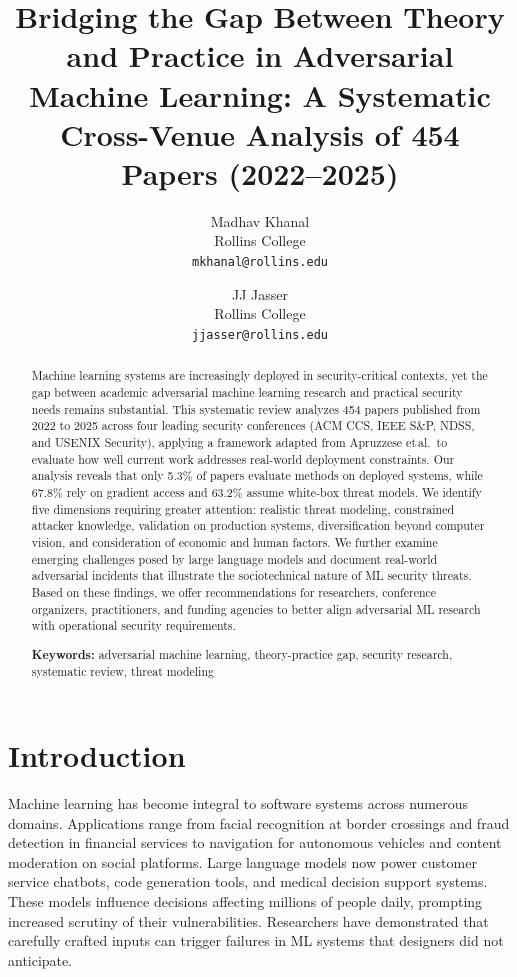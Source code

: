 \documentclass[11pt,a4paper]{article}
\title{\textbf{Bridging the Gap Between Theory and Practice in Adversarial Machine Learning: A Systematic Cross-Venue Analysis of 454 Papers (2022--2025)}}
\author{
  Madhav Khanal\\
  Rollins College\\
  \texttt{mkhanal@rollins.edu}
  \and
  JJ Jasser\\
  Rollins College\\
  \texttt{jjasser@rollins.edu}
}
\date{}
\begin{document}
\maketitle

\begin{abstract}
Machine learning systems are increasingly deployed in security-critical contexts, yet the gap between academic adversarial machine learning research and practical security needs remains substantial. This systematic review analyzes 454 papers published from 2022 to 2025 across four leading security conferences (ACM CCS, IEEE S\&P, NDSS, and USENIX Security), applying a framework adapted from Apruzzese et\,al.\ to evaluate how well current work addresses real-world deployment constraints. Our analysis reveals that only 5.3\% of papers evaluate methods on deployed systems, while 67.8\% rely on gradient access and 63.2\% assume white-box threat models. We identify five dimensions requiring greater attention: realistic threat modeling, constrained attacker knowledge, validation on production systems, diversification beyond computer vision, and consideration of economic and human factors. We further examine emerging challenges posed by large language models and document real-world adversarial incidents that illustrate the sociotechnical nature of ML security threats. Based on these findings, we offer recommendations for researchers, conference organizers, practitioners, and funding agencies to better align adversarial ML research with operational security requirements.

\textbf{Keywords:} adversarial machine learning, theory-practice gap, security research, systematic review, threat modeling
\end{abstract}

\newpage
\tableofcontents
\newpage

\section{Introduction}

Machine learning has become integral to software systems across numerous domains. Applications range from facial recognition at border crossings and fraud detection in financial services to navigation for autonomous vehicles and content moderation on social platforms. Large language models now power customer service chatbots, code generation tools, and medical decision support systems. These models influence decisions affecting millions of people daily, prompting increased scrutiny of their vulnerabilities. Researchers have demonstrated that carefully crafted inputs can trigger failures in ML systems that designers did not anticipate.
\end{document}
